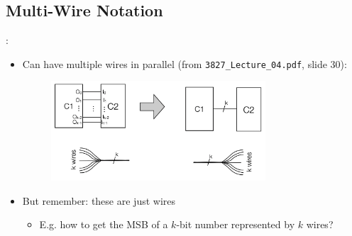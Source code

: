 \documentclass{../slides}
\begin{document}
\subsection{Multi-Wire Notation}
\begin{frame}{\secname: \subsecname}
    \begin{itemize}
        \item Can have multiple wires in parallel (from \lstinline{3827_Lecture_04.pdf}, slide 30):
        \begin{figure}[H]
            \centering
            \includegraphics[width = 8cm]{img/multi.png}
        \end{figure}
        \item But remember: these are just wires
        \begin{itemize}
            \item E.g. how to get the MSB of a $k$-bit number represented by $k$ wires?
        \end{itemize}
    \end{itemize}
\end{frame}
\end{document}
